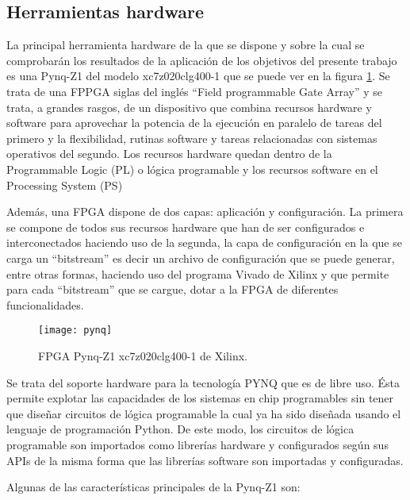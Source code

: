 
\subsection{Herramientas hardware} \label{herraminetas_hardware}
La principal herramienta hardware de la que se dispone y sobre la cual se comprobarán los resultados de la aplicación de los objetivos del presente trabajo es una Pynq-Z1\cite{pynq} del modelo xc7z020clg400-1 que se puede ver en la figura \ref{fig:pynq}. Se trata de una FPPGA siglas del inglés ``Field programmable Gate Array'' y se trata, a grandes rasgos, de un dispositivo que combina recursos hardware y software para aprovechar la potencia de la ejecución en paralelo de tareas del primero y la flexibilidad, rutinas software y tareas relacionadas con sistemas operativos del segundo. Los recursos hardware quedan dentro de la Programmable Logic (PL) o lógica programable y los recursos software en el Processing System (PS)

Además, una FPGA dispone de dos capas: aplicación y configuración. La primera se compone de todos sus recursos hardware que han de ser configurados e interconectados haciendo uso de la segunda, la capa de configuración en la que se carga un ``bitstream'' es decir un archivo de configuración que se puede generar, entre otras formas, haciendo uso del programa Vivado de Xilinx y que permite para cada ``bitstream'' que se cargue, dotar a la FPGA de diferentes funcionalidades.



\begin{figure}
\centering
\texttt{[image: pynq]}
  \caption{FPGA Pynq-Z1 xc7z020clg400-1 de Xilinx.}\label{fig:pynq}
\end{figure}

Se trata del soporte hardware para la tecnología PYNQ que es de libre uso. Ésta permite explotar las capacidades de los sistemas en chip programables sin tener que diseñar circuitos de lógica programable la cual ya ha sido diseñada usando el lenguaje de programación Python. De este modo, los circuitos de lógica programable son importados como librerías hardware y configurados según sus APIs de la misma forma que las librerías software son importadas y configuradas.

Algunas de las características principales de la Pynq-Z1 son:

